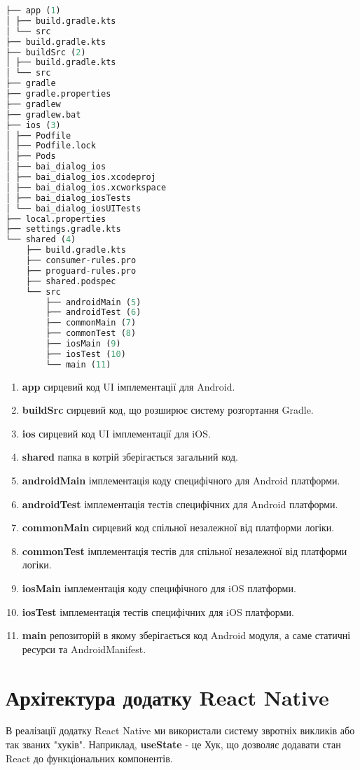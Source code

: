 \begin{lstlisting}[style=light, language=Python,label={lst:kmm_project_layout},caption=KMM Project Layout]
├── app (1)
│ ├── build.gradle.kts
│ └── src
├── build.gradle.kts
├── buildSrc (2)
│ ├── build.gradle.kts
│ └── src
├── gradle
├── gradle.properties
├── gradlew
├── gradlew.bat
├── ios (3)
│ ├── Podfile
│ ├── Podfile.lock
│ ├── Pods
│ ├── bai_dialog_ios
│ ├── bai_dialog_ios.xcodeproj
│ ├── bai_dialog_ios.xcworkspace
│ ├── bai_dialog_iosTests
│ └── bai_dialog_iosUITests
├── local.properties
├── settings.gradle.kts
└── shared (4)
    ├── build.gradle.kts
    ├── consumer-rules.pro
    ├── proguard-rules.pro
    ├── shared.podspec
    └── src
        ├── androidMain (5)
        ├── androidTest (6)
        ├── commonMain (7)
        ├── commonTest (8)
        ├── iosMain (9)
        ├── iosTest (10)
        └── main (11)
\end{lstlisting}

\begin{enumerate}
    \item \textbf{app} сирцевий код UI імплементації для Android.
    \item \textbf{buildSrc} сирцевий код, що розширює систему розгортання Gradle.
    \item \textbf{ios} сирцевий код UI імплементації для iOS.
    \item \textbf{shared} папка в котрій зберігається загальний код.
    \item \textbf{androidMain} імплементація коду специфічного для Android платформи.
    \item \textbf{androidTest} імплементація тестів специфічних для Android платформи.
    \item \textbf{commonMain} сирцевий код спільної незалежної від платформи логіки.
    \item \textbf{commonTest} імплементація тестів для спільної незалежної від платформи логіки.
    \item \textbf{iosMain} імплементація коду специфічного для iOS платформи.
    \item \textbf{iosTest} імплементація тестів специфічних для iOS платформи.
    \item \textbf{main} репозиторій в якому зберігається код Android модуля, а саме статичні ресурси та AndroidManifest.
\end{enumerate}


\section{Архітектура додатку React Native}
\label{sec:kn_app_architecture}
В реалізації додатку React Native ми використали систему звротніх викликів або так званих "хуків".
Наприклад, \textbf{useState} - це Хук, що дозволяє додавати стан React до функціональних компонентів.

